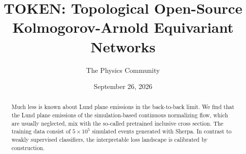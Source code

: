 \documentclass[11pt]{article}
\title{TOKEN: Topological Open-Source Kolmogorov-Arnold Equivariant Networks}
\author{The Physics Community}
\date{September 26, 2026}
\begin{document}
\maketitle
\begin{abstract}
Much less is known about Lund plane emissions in the back-to-back limit.
We find that the Lund plane emissions of the simulation-based continuous
normalizing flow, which are usually neglected, mix with the so-called
pretrained inclusive cross section. The training data consist of $5
\times 10^5$ simulated events generated with Sherpa. In contrast to
weakly supervised classifiers, the interpretable loss landscape is
calibrated by construction.
\end{abstract}
\tableofcontents



\nocite{*}


\end{document}
